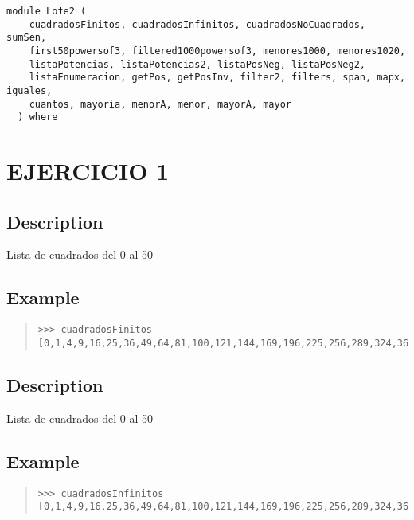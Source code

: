 \label{module:Lote2}
\haddockbeginheader
{\haddockverb\begin{verbatim}
module Lote2 (
    cuadradosFinitos, cuadradosInfinitos, cuadradosNoCuadrados, sumSen,
    first50powersof3, filtered1000powersof3, menores1000, menores1020,
    listaPotencias, listaPotencias2, listaPosNeg, listaPosNeg2,
    listaEnumeracion, getPos, getPosInv, filter2, filters, span, mapx, iguales,
    cuantos, mayoria, menorA, menor, mayorA, mayor
  ) where\end{verbatim}}
\haddockendheader

\section{EJERCICIO 1}
\begin{haddockdesc}
\item[\begin{tabular}{@{}l}
cuadradosFinitos :: {\char 91}Integer{\char 93}
\end{tabular}]
{\haddockbegindoc
\section*{Description}
Lista de cuadrados del 0 al 50\par
\subsection*{Example}
\begin{quote}
{\haddockverb\begin{verbatim}
>>> cuadradosFinitos
[0,1,4,9,16,25,36,49,64,81,100,121,144,169,196,225,256,289,324,361,400,441,484,529,576,625,676,729,784,841,900,961,1024,1089,1156,1225,1296,1369,1444,1521,1600,1681,1764,1849,1936,2025,2116,2209,2304,2401,2500]

\end{verbatim}}
\end{quote}}
\end{haddockdesc}
\begin{haddockdesc}
\item[\begin{tabular}{@{}l}
cuadradosInfinitos :: {\char 91}Integer{\char 93}
\end{tabular}]
{\haddockbegindoc
\section*{Description}
Lista de cuadrados del 0 al 50\par
\subsection*{Example}
\begin{quote}
{\haddockverb\begin{verbatim}
>>> cuadradosInfinitos
[0,1,4,9,16,25,36,49,64,81,100,121,144,169,196,225,256,289,324,361,400,441,484,529,576,625,676,729,784,841,900,961,1024,1089,1156,1225,1296,1369,1444,1521,1600,1681,1764,1849,1936,2025,2116,2209,2304,2401,2500]

\end{verbatim}}
\end{quote}}
\end{haddockdesc}
